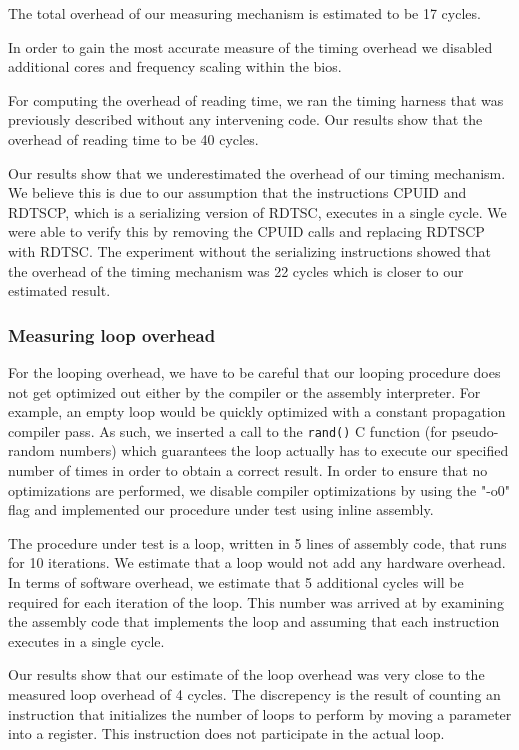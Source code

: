 The total overhead of our measuring mechanism is estimated to be 17 cycles.

In order to gain the most accurate measure of the timing overhead we disabled
additional cores and frequency scaling within the bios.

For computing the overhead of reading time, we ran the timing harness that was
previously described without any intervening code.  Our results show that the
overhead of reading time to be 40 cycles. 

Our results show that we underestimated the overhead of our timing mechanism. We
believe this is due to our assumption that the instructions CPUID and RDTSCP,
which is a serializing version of RDTSC, executes in a single cycle. We were
able to verify this by removing the CPUID calls and replacing RDTSCP with RDTSC.
The experiment without the serializing instructions showed that the overhead of
the timing mechanism was 22 cycles which is closer to our estimated result.

\subsubsection{Measuring loop overhead}

For the looping overhead,  we have to be careful that our looping procedure does
not get optimized out either by the compiler or the assembly interpreter. For
example, an empty loop would be quickly optimized with a constant propagation
compiler pass. As such, we inserted a call to the \texttt{rand()} C function
(for pseudo-random numbers) which guarantees the loop actually has to execute
our specified number of times in order to obtain a correct result. In order to
ensure that no optimizations are performed,  we disable compiler optimizations
by using the "-o0" flag and implemented our procedure under test using inline
assembly.

The procedure under test is a loop, written in 5 lines of assembly code, that
runs for 10 iterations.  We estimate that a loop would not add any hardware
overhead. In terms of software overhead, we estimate that 5 additional cycles
will be required for each iteration of the loop. This number was arrived at by
examining the assembly code that implements the loop and assuming that each
instruction executes in a single cycle.

Our results show that our estimate of the loop overhead was very close to the
measured loop overhead of 4 cycles. The discrepency is the result of counting an
instruction that initializes the number of loops to perform by moving a
parameter into a register. This instruction does not participate in the actual
loop.

